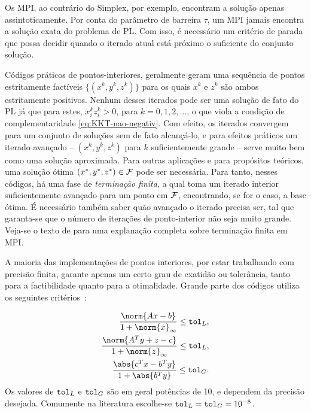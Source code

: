 Os \ac{MPI}, ao contrário do  Simplex, por exemplo, encontram a solução apenas
assintoticamente. Por conta do parâmetro de barreira $\tau$, um \ac{MPI} jamais encontra
a solução exata do problema de \ac{PL}. Com isso, é necessário um critério de
parada que possa decidir quando o iterado atual está próximo o suficiente 
do conjunto solução. 


Códigos práticos de pontos-interiores,  geralmente geram uma sequência de
pontos estritamente factíveis $\{(x^k,y^k,z^k)\}$ para os quais $x^k$ e $z^k$
são ambos estritamente positivos. Nenhum desses iterados pode ser uma solução de
fato do \ac{PL} já que para estes, $x^k_iz^k_i>0$, para $k=0,1,2,\ldots$, o que
viola a condição de complementaridade \eqref{eq:KKT-nao-negativ}. Com efeito, os
iterados convergem para um conjunto de soluções sem de fato alcançá-lo, e para
efeitos práticos um iterado avançado  -- $(x^k,y^k,z^k)$ para $k$ suficientemente
grande --  serve muito bem como uma solução aproximada. Para outras aplicações e
para propósitos teóricos, uma solução ótima $(x^*,y^*,z^*)\in\mathcal{F}$ pode ser
necessária. Para tanto, nesses códigos,  há uma fase de
\emph{terminação finita}, a qual toma um iterado interior suficientemente avançado
para um ponto em $\mathcal{F}$, encontrando, se for o caso, a base ótima. É
necessário também saber quão avançado o iterado precisa ser, tal que
garanta-se que o número de iterações de ponto-interior não seja muito grande. Veja-se o texto de \textcite[Cap. 7]{Wright:Primal-dual-interior-point:1997h} para uma explanação completa sobre terminação finita em \ac{MPI}.

A maioria das implementações de pontos interiores, por estar trabalhando com
precisão finita, garante apenas um certo grau de exatidão ou tolerância, tanto para a factibilidade quanto para a otimalidade. Grande parte
dos códigos utiliza os seguintes critérios~\cite{Gondzio:1996:CVI,Czyzyk:1999hk}:	


\begin{subequations}
\label{eq:termination-criteria}
\begin{align}
	\dfrac{\norm{Ax - b}}{1 + \norm{x}_{\infty}} \leq \tolL,
	\label{eq:termination-criteria-primal}\\ 
	\dfrac{\norm{A^Ty + z - c}}{1 + \norm{z}_{\infty}} \leq
	\tolL,\label{eq:termination-criteria-dual} \\ 
	\dfrac{\abs{c^Tx - b^T y}}{1 + \abs{b^Ty}}\leq
	\tolG.\label{eq:termination-criteria-gap}
\end{align}
\end{subequations}
Os valores de $\mathtt{tol}_{L}$ e $\mathtt{tol}_{G}$ são em geral potências de 10, e  dependem da precisão desejada. Comumente na literatura escolhe-se $\mathtt{tol}_{L}=\mathtt{tol}_{G}=10^{-8}$.  


